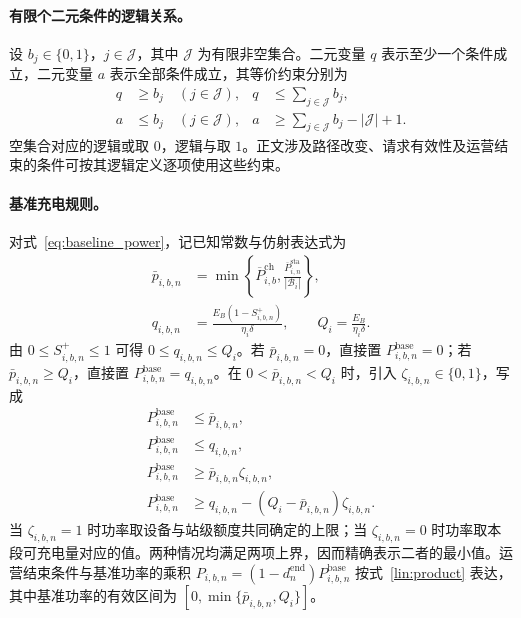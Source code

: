 \documentclass[12pt,a4paper,UTF8]{ctexart}
\numberwithin{equation}{section}
\begin{document}
\paragraph{有限个二元条件的逻辑关系。}
设 $b_j\in\{0,1\}$，$j\in\mathcal J$，其中 $\mathcal J$ 为有限非空集合。二元变量 $q$ 表示至少一个条件成立，二元变量 $a$ 表示全部条件成立，其等价约束分别为
\begin{equation}
\begin{aligned}
q&\ge b_j\quad(j\in\mathcal J), & q&\le\sum_{j\in\mathcal J}b_j,\\
a&\le b_j\quad(j\in\mathcal J), & a&\ge\sum_{j\in\mathcal J}b_j-|\mathcal J|+1.
\end{aligned}
\label{lin:logic}
\end{equation}
空集合对应的逻辑或取 $0$，逻辑与取 $1$。正文涉及路径改变、请求有效性及运营结束的条件可按其逻辑定义逐项使用这些约束。

\paragraph{基准充电规则。}
对式~\eqref{eq:baseline_power}，记已知常数与仿射表达式为
\begin{equation}
\begin{aligned}
\bar p_{i,b,n}
&=\min\left\{\overline P_{i,b}^{\mathrm{ch}},
\frac{\overline P_{i,n}^{\mathrm{sta}}}{|\mathcal B_i|}\right\},\\
q_{i,b,n}&=\frac{E_B(1-S_{i,b,n}^{+})}{\eta_i\delta},
\qquad Q_i=\frac{E_B}{\eta_i\delta}.
\end{aligned}
\label{lin:baseline_bounds}
\end{equation}
由 $0\le S_{i,b,n}^{+}\le1$ 可得 $0\le q_{i,b,n}\le Q_i$。若 $\bar p_{i,b,n}=0$，直接置 $P_{i,b,n}^{\mathrm{base}}=0$；若 $\bar p_{i,b,n}\ge Q_i$，直接置 $P_{i,b,n}^{\mathrm{base}}=q_{i,b,n}$。在 $0<\bar p_{i,b,n}<Q_i$ 时，引入 $\zeta_{i,b,n}\in\{0,1\}$，写成
\begin{equation}
\begin{aligned}
P_{i,b,n}^{\mathrm{base}}&\le\bar p_{i,b,n},\\
P_{i,b,n}^{\mathrm{base}}&\le q_{i,b,n},\\
P_{i,b,n}^{\mathrm{base}}&\ge\bar p_{i,b,n}\zeta_{i,b,n},\\
P_{i,b,n}^{\mathrm{base}}&\ge q_{i,b,n}-(Q_i-\bar p_{i,b,n})\zeta_{i,b,n}.
\end{aligned}
\label{lin:baseline_min}
\end{equation}
当 $\zeta_{i,b,n}=1$ 时功率取设备与站级额度共同确定的上限；当 $\zeta_{i,b,n}=0$ 时功率取本段可充电量对应的值。两种情况均满足两项上界，因而精确表示二者的最小值。运营结束条件与基准功率的乘积 $P_{i,b,n}=(1-d_n^{\mathrm{end}})P_{i,b,n}^{\mathrm{base}}$ 按式~\eqref{lin:product} 表达，其中基准功率的有效区间为 $[0,\min\{\bar p_{i,b,n},Q_i\}]$。
\end{document}
